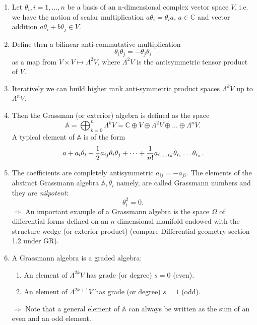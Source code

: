 \begin{enumerate}
\item Let $\theta_i, i=1,\dots,n$ be a basis of an n-dimensional complex vector space $V$, i.e. we have the notion of scalar multiplication $a \theta_i = \theta_i a$, $a\in \mathbb{C}$ and vector addition $a \theta_i+b \theta_j \in V$.
\item Define then a bilinear anti-commutative multiplication
\begin{equation}
	\theta_i \theta_j = - \theta_j \theta_i
\end{equation}
as a map from $V\times V\mapsto \Lambda^2 V$, where $\Lambda^2 V$ is the antisymmetric tensor product of $V$.
\item Iteratively we can build higher rank anti-symmetric product spaces $\Lambda^kV$ up to $\Lambda^n V$.
\item Then the Grassman (or exterior) algebra is defined as the space
\begin{equation}
	\mathbb{A} = \bigoplus_{k=0}^n \Lambda^k V = \mathbb{C} \oplus V \oplus \Lambda^2 V \oplus \dots \oplus \Lambda^n V.
\end{equation}
A typical element of $\mathbb{A}$ is of the form
\begin{equation}
	a + a_i \theta_i + \frac{1}{2} a_{ij} \theta_i  \theta_j + \dots + \frac{1}{n!} a_{i_1 \dots i_n} \theta_{i_1} \dots \theta_{i_n}.
\end{equation}
\item The coefficients are completely antisymmetric $a_{ij}=-a_{ji}$. The elements of the abstract Grassmann algebra $\mathbb{A}, \theta_i$ namely, are called Grassmann numbers and they are \emph{nilpotent}:
\begin{equation}
	\theta^2_i = 0.
\end{equation}
$\Rightarrow$ An important example of a Grassmann algebra is the space $\Omega$ of differential forms defined on an $n$-dimensional manifold endowed with the structure wedge (or exterior product) (compare Differential geometry section 1.2 under GR).
\item A Grassmann algebra is a graded algebra:
\begin{enumerate}
	\item An element of $\Lambda^{2k}V$ has grade (or degree) $s=0$ (even).
	\item An element of $\Lambda^{2k+1}V$ has grade (or degree) $s=1$ (odd).
\end{enumerate}
$\Rightarrow$ Note that a general element of $\mathbb{A}$ can always be written as the sum of an even and an odd element.

\end{enumerate}
